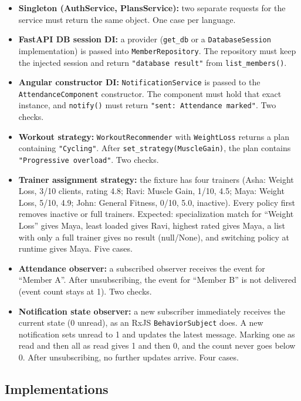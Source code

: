 \documentclass[11pt,a4paper]{article}
\begin{document}
\begin{itemize}
\item \textbf{Singleton (AuthService, PlansService):} two separate requests for the service must return the same object. One case per language.
\item \textbf{FastAPI DB session DI:} a provider (\texttt{get\_db} or a \texttt{DatabaseSession} implementation) is passed into \texttt{MemberRepository}. The repository must keep the injected session and return \texttt{"database result"} from \texttt{list\_members()}.
\item \textbf{Angular constructor DI:} \texttt{NotificationService} is passed to the \texttt{AttendanceComponent} constructor. The component must hold that exact instance, and \texttt{notify()} must return \texttt{"sent: Attendance marked"}. Two checks.
\item \textbf{Workout strategy:} \texttt{WorkoutRecommender} with \texttt{WeightLoss} returns a plan containing \texttt{"Cycling"}. After \texttt{set\_strategy(MuscleGain)}, the plan contains \texttt{"Progressive overload"}. Two checks.
\item \textbf{Trainer assignment strategy:} the fixture has four trainers (Asha: Weight Loss, 3/10 clients, rating 4.8; Ravi: Muscle Gain, 1/10, 4.5; Maya: Weight Loss, 5/10, 4.9; John: General Fitness, 0/10, 5.0, inactive). Every policy first removes inactive or full trainers. Expected: specialization match for ``Weight Loss'' gives Maya, least loaded gives Ravi, highest rated gives Maya, a list with only a full trainer gives no result (null/None), and switching policy at runtime gives Maya. Five cases.
\item \textbf{Attendance observer:} a subscribed observer receives the event for ``Member A''. After unsubscribing, the event for ``Member B'' is not delivered (event count stays at 1). Two checks.
\item \textbf{Notification state observer:} a new subscriber immediately receives the current state (0 unread), as an RxJS \texttt{BehaviorSubject} does. A new notification sets unread to 1 and updates the latest message. Marking one as read and then all as read gives 1 and then 0, and the count never goes below 0. After unsubscribing, no further updates arrive. Four cases.
\end{itemize}

\subsection{Implementations}
\end{document}
